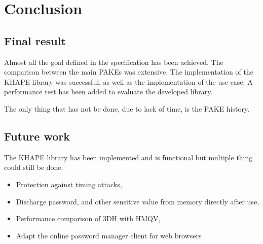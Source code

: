 \documentclass[../report.tex]{subfiles}
\begin{document}
\chapter{Conclusion}
\section{Final result}
Almost all the goal defined in the specification has been achieved.
The comparison between the main PAKEs was extensive. The implementation of the KHAPE library was successful, as well as the implementation of the use case.
A performance test has been added to evaluate the developed library.

The only thing that has not be done, due to lack of time, is the PAKE history.








\section{Future work}
The KHAPE library has been implemented and is functional but multiple thing could still be done.
\begin{itemize}
 \item Protection against timing attacks,
 \item Discharge password, and other sensitive value from memory directly after use,
 \item Performance comparison of 3DH with HMQV,
 \item Adapt the online password manager client for web browsers
\end{itemize}





\end{document}
